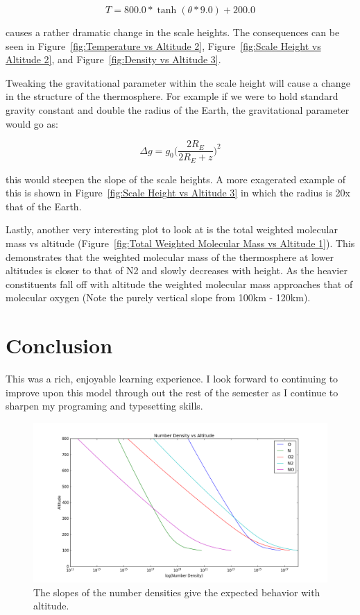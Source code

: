\documentclass[12pt,letterpaper]{article}
\begin{document}
\begin{equation} \label{eq:T2}
	T = 800.0*\tanh(\theta*9.0)+200.0
\end{equation}

\noindent causes a rather dramatic change in the scale heights. The consequences can be seen in Figure~\ref{fig:Temperature vs Altitude 2}, Figure~\ref{fig:Scale Height vs Altitude 2}, and Figure~\ref{fig:Density vs Altitude 3}.

Tweaking the gravitational parameter within the scale height will cause a change in the structure of the thermosphere. For example if we were to hold standard gravity constant and double the radius of the Earth, the gravitational parameter would go as:

\begin{equation}
	\Delta g=g_{0}\bigg(\frac{2R_{E}}{2R_{E}+z}\bigg)^2
\end{equation}

\noindent this would steepen the slope of the scale heights. A more exagerated example of this is shown in Figure~\ref{fig:Scale Height vs Altitude 3} in which the radius is 20x that of the Earth.

Lastly, another very interesting plot to look at is the total weighted molecular mass vs altitude (Figure~\ref{fig:Total Weighted Molecular Mass vs Altitude 1}). This demonstrates that the weighted molecular mass of the thermosphere at lower altitudes is closer to that of N2 and slowly decreases with height. As the heavier constituents fall off with altitude the weighted molecular mass approaches that of molecular oxygen (Note the purely vertical slope from 100km - 120km).

\section{Conclusion}

This was a rich, enjoyable learning experience. I look forward to continuing to improve upon this model through out the rest of the semester as I continue to sharpen my programing and typesetting skills.

\begin{figure}[htb]
\includegraphics[scale = .40, keepaspectratio]{Figures/Density_vs_Altitude_100_800.png}
\caption{The slopes of the number densities give the expected behavior with altitude.}
\label{fig:Density vs Altitude 1}
\end{figure}
\end{document}
